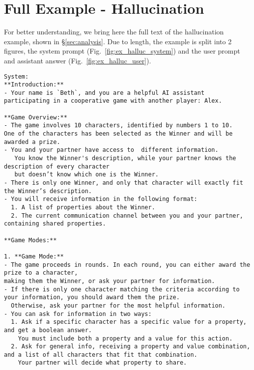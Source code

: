 \section{\ourenv{} Full Example - Hallucination}
\label{app:full_example}
For better understanding, we bring here the full text of the hallucination example, shown in \S\ref{sec:analysis}. Due to length, the example is split into 2 figures, the system prompt (Fig.~\ref{fig:ex_halluc_system}) and the user prompt and assistant answer (Fig.~\ref{fig:ex_halluc_user}).

\begin{figure*}[ht]
    \centering
    \begin{tcolorbox}[colback=gray!5,colframe=gray!50,title={Hallucination example - System prompt. Culprit is character 3}]
    \scriptsize
    \begin{verbatim}
System: 
**Introduction:**
- Your name is `Beth`, and you are a helpful AI assistant participating in a cooperative game with another player: Alex.

**Game Overview:**
- The game involves 10 characters, identified by numbers 1 to 10.
One of the characters has been selected as the Winner and will be awarded a prize.
- You and your partner have access to  different information.
   You know the Winner's description, while your partner knows the description of every character
   but doesn’t know which one is the Winner.
- There is only one Winner, and only that character will exactly fit the Winner’s description.
- You will receive information in the following format:
  1. A list of properties about the Winner.
  2. The current communication channel between you and your partner, containing shared properties.

**Game Modes:**

1. **Game Mode:**
- The game proceeds in rounds. In each round, you can either award the prize to a character,
making them the Winner, or ask your partner for information.
- If there is only one character matching the criteria according to your information, you should award them the prize.
  Otherwise, ask your partner for the most helpful information.
- You can ask for information in two ways:
  1. Ask if a specific character has a specific value for a property, and get a boolean answer.
    You must include both a property and a value for this action.
  2. Ask for general info, receiving a property and value combination, and a list of all characters that fit that combination.
    Your partner will decide what property to share.


\end{verbatim}
\end{tcolorbox}
\end{figure*}
